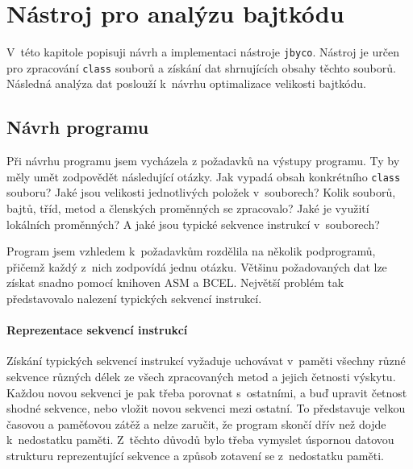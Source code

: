 \chapter{Nástroj pro analýzu bajtkódu}\label{Tool}



V~této kapitole popisuji návrh a implementaci nástroje \texttt{jbyco}. Nástroj je určen pro zpracování \texttt{class} souborů a získání dat shrnujících obsahy těchto souborů. Následná analýza dat poslouží k~návrhu optimalizace velikosti bajtkódu.

\section{Návrh programu}\label{ToolDesign}

Při návrhu programu jsem vycházela z požadavků na výstupy programu.
Ty by měly umět zodpovědět následující otázky. Jak vypadá obsah konkrétního \texttt{class} souboru? Jaké jsou velikosti jednotlivých položek v~souborech? Kolik souborů, bajtů, tříd, metod a členských proměnných se zpracovalo? Jaké je využití lokálních proměnných? A jaké jsou typické sekvence instrukcí v~souborech?

Program jsem vzhledem k~požadavkům rozdělila na několik podprogramů, přičemž každý z~nich zodpovídá jednu otázku. 
Většinu požadovaných dat lze získat snadno pomocí knihoven ASM a BCEL. Největší problém tak představovalo nalezení typických sekvencí instrukcí.

\subsubsection{Reprezentace sekvencí instrukcí}

Získání typických sekvencí instrukcí vyžaduje uchovávat v~paměti všechny různé sekvence různých délek ze všech zpracovaných metod a jejich četnosti výskytu. Každou novou sekvenci je pak třeba porovnat s~ostatními, a buď upravit četnost shodné sekvence, nebo vložit novou sekvenci mezi ostatní. To představuje velkou časovou a paměťovou zátěž a nelze zaručit, že program skončí dřív než dojde k~nedostatku paměti. Z~těchto důvodů bylo třeba vymyslet úspornou datovou strukturu reprezentující sekvence a způsob zotavení se z~nedostatku paměti.

